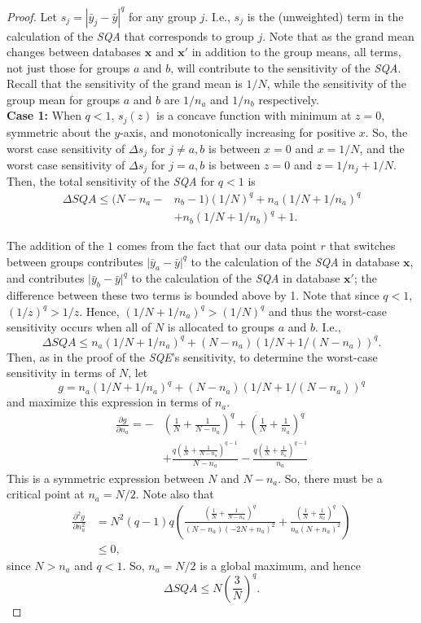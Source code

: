 \documentclass[USenglish,oneside]{article}
\newcounter{ab}
\newcounter{ar}
\newcounter{igh}
\newcounter{ms}
\newcommand{\grand}{\bar{y}}
\newcommand{\sqa}{\textit{SQA}\xspace}
\newcommand{\sqe}{\textit{SQE}\xspace}
\newcommand{\x}{\ensuremath{\mathbf{x}}\xspace}
\newcommand{\xprime}{\ensuremath{\mathbf{x'}}\xspace}
\begin{document}
\begin{proof}
Let $s_{j} =  \left\vert \bar{y}_{j} - \grand \right\vert ^q$ for any group $j$. I.e., $s_{j}$ is the (unweighted) term in the calculation of the \sqa that corresponds to group $j$. Note that as the grand mean changes between databases $\x$ and $\xprime$ in addition to the group means, all terms, not just those for groups $a$ and $b$, will contribute to the sensitivity of the \sqa. Recall that the sensitivity of the grand mean is $1/N$, while the sensitivity of the group mean for groups $a$ and $b$ are $1/n_a$ and $1/n_b$ respectively. \\

\noindent\textbf{Case 1:} When $q<1$, $s_j(z)$ is a concave function with minimum at $z=0$, symmetric about the $y$-axis, and monotonically increasing for positive $x$. So, the worst case sensitivity of $\Delta s_j$ for $j \ne a,b$ is between $x=0$ and $x=1/N$, and the worst case sensitivity of $\Delta s_j$ for $j = a,b$ is between $z=0$ and $z=1/n_j + 1/N$. Then, the total sensitivity of the \sqa for $q<1$ is
%
\begin{align*}
 \Delta\sqa \le  (N-n_a-&n_b-1)(1/N)^q + n_a(1/N + 1/n_a)^q \\
 &+ n_b(1/N + 1/n_b)^q + 1 .
\end{align*}

The addition of the $1$ comes from the fact that our data point $r$ that switches between groups contributes $\vert \bar{y}_a - \grand \vert^q$ to the calculation of the \sqa in database \x, and contributes $\vert \bar{y}_b - \grand \vert^q$ to the calculation of the \sqa in database \xprime; the difference between these two terms is bounded above by 1. Note that since $q<1$, $(1/z)^q > 1/z$. Hence, $(1/N + 1/n_a)^q > (1/N)^q$ and thus the worst-case sensitivity occurs when all of $N$ is allocated to groups $a$ and $b$. I.e.,
%
$$ \Delta\sqa \le n_a(1/N + 1/n_a)^q + (N-n_a)(1/N + 1/(N-n_a))^q. $$
Then, as in the proof of the \sqe's sensitivity, to determine the worst-case sensitivity in terms of $N$, let 
$$g = n_a(1/N + 1/n_a)^q + (N-n_a)(1/N + 1/(N-n_a))^q $$
and maximize this expression in terms of $n_a$.
\begin{align*}
\frac{\partial g}{\partial n_a} = -&\left(\frac{1}{N} + \frac{1}{N-n_a}\right)^q + \left(\frac{1}{N} + \frac{1}{n_a}\right)^q \\
&+ \frac{q\left(\frac{1}{N} + \frac{1}{N-n_a}\right)^{q-1}}{N-n_a} - \frac{q\left(\frac{1}{N} + \frac{1}{n_a}\right)^{q-1}}{n_a}
\end{align*}
This is a symmetric expression between $N$ and $N-n_a$. So, there must be a critical point at $n_a = N/2$. Note also that
\begin{align*}
\frac{\partial^2 g}{\partial n_a^2} &= N^2(q-1)q \left( \frac{(\frac{1}{N} + \frac{1}{N-n_a})^q}{(N-n_a)(-2N+n_a)^2} + \frac{\left(\frac{1}{N} + \frac{1}{n_a}\right)^q}{n_a(N+n_a)^2}\right) \\
	&\le 0,
\end{align*}
since $N>n_a$ and $q<1$. So, $n_a = N/2$ is a global maximum, and hence
%
$$\Delta\sqa \le N \left( \frac{3}{N} \right)^q.$$


\end{proof}
\end{document}
